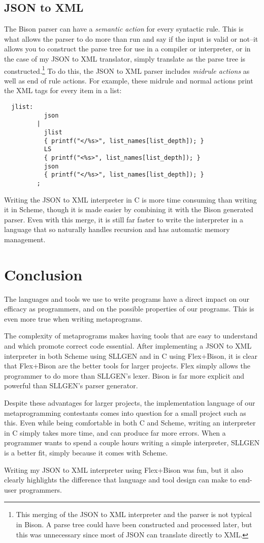 \documentclass[12pt]{article}
\begin{document}
\subsection{JSON to XML}
The Bison parser can have a \textit{semantic action} for every
syntactic rule.\cite[3.4.6]{bison}  This is what allows the
parser to do more than run and say if the input is valid or not--it
allows you to construct the parse tree for use in a compiler or
interpreter, or in the case of my JSON to XML translator, simply
translate as the parse tree is constructed.\footnote{This merging of
  the JSON to XML interpreter and the parser is not typical in Bison.
  A parse tree could have been constructed and processed later, but
  this was unnecessary since most of JSON can translate directly to
  XML.} To do this, the JSON to XML parser includes \textit{midrule
  actions}\cite[3.4.8]{bison} as well as end of rule
actions.  For example, these midrule and normal actions print the XML
tags for every item in a list:
\pagebreak
\begin{lstlisting}
  jlist:
           json
         |
           jlist
           { printf("</%s>", list_names[list_depth]); }
           LS
           { printf("<%s>", list_names[list_depth]); }
           json
           { printf("</%s>", list_names[list_depth]); }
         ;
\end{lstlisting}
Writing the JSON to XML interpreter in C is more time consuming than
writing it in Scheme, though it is made easier by combining it with
the Bison generated parser.  Even with this merge, it is still far
faster to write the interpreter in a language that so naturally
handles recursion and has automatic memory management.
\section{Conclusion}
The languages and tools we use to write programs have a direct impact
on our efficacy as programmers, and on the possible properties of our
programs.  This is even more true when writing metaprograms.\par
The complexity of metaprograms makes having tools that are easy to
understand and which promote correct code essential.  After
implementing a JSON to XML interpreter in both Scheme using SLLGEN and
in C using Flex+Bison, it is clear that Flex+Bison are the better
tools for larger projects.  Flex simply allows the programmer to do
more than SLLGEN's lexer.  Bison is far more explicit and powerful
than SLLGEN's parser generator.\par
Despite these advantages for larger projects, the implementation
language of our metaprogramming contestants comes into question for a
small project such as this.  Even while being comfortable in both C
and Scheme, writing an interpreter in C simply takes more time, and
can produce far more errors.  When a programmer wants to spend a
couple hours writing a simple interpreter, SLLGEN is a better fit,
simply because it comes with Scheme.\par
Writing my JSON to XML interpreter using Flex+Bison was fun, but it
also clearly highlights the difference that language and tool design
can make to end-user programmers.
\end{document}
